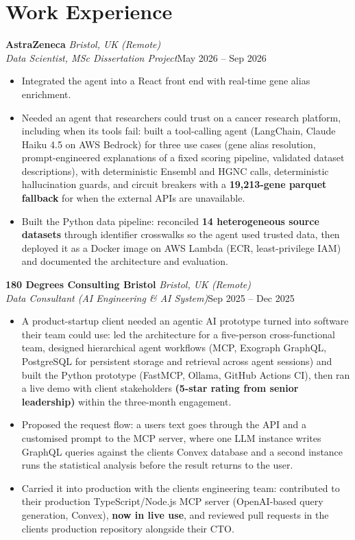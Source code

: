 \documentclass[a4paper,11pt]{article}
\newcommand{\role}[4]{%
  \textbf{#1}{\color{muted}\,\textperiodcentered\,\textit{#2}}\\
  \textit{#4}\hfill{\color{muted}#3}\par}
\newcommand{\gap}{\vspace{5pt}}
\newcommand{\num}[1]{\textbf{#1}}   %
\begin{document}
\section{Work Experience}
\role{AstraZeneca}{Bristol, UK (Remote)}{May 2026 – Sep 2026}{Data Scientist, MSc Dissertation Project}
\begin{itemize}
  \item Integrated the agent into a React front end with real-time gene alias enrichment.
  \item Needed an agent that researchers could trust on a cancer research platform, including when its tools fail: built a tool-calling agent (LangChain, Claude Haiku 4.5 on AWS Bedrock) for three use cases (gene alias resolution, prompt-engineered explanations of a fixed scoring pipeline, validated dataset descriptions), with deterministic Ensembl and HGNC calls, deterministic hallucination guards, and circuit breakers with a \num{19,213-gene parquet fallback} for when the external APIs are unavailable.
  \item Built the Python data pipeline: reconciled \num{14 heterogeneous source datasets} through identifier crosswalks so the agent used trusted data, then deployed it as a Docker image on AWS Lambda (ECR, least-privilege IAM) and documented the architecture and evaluation.
\end{itemize}
\gap
{}
\role{180 Degrees Consulting Bristol}{Bristol, UK (Remote)}{Sep 2025 – Dec 2025}{Data Consultant (AI Engineering \& AI System)}
\begin{itemize}
  \item A product-startup client needed an agentic AI prototype turned into software their team could use: led the architecture for a five-person cross-functional team, designed hierarchical agent workflows (MCP, Exograph GraphQL, PostgreSQL for persistent storage and retrieval across agent sessions) and built the Python prototype (FastMCP, Ollama, GitHub Actions CI), then ran a live demo with client stakeholders \num{(5-star rating from senior leadership)} within the three-month engagement.
  \item Proposed the request flow: a user\textquotesingle{}s text goes through the API and a customised prompt to the MCP server, where one LLM instance writes GraphQL queries against the client\textquotesingle{}s Convex database and a second instance runs the statistical analysis before the result returns to the user.
  \item Carried it into production with the client\textquotesingle{}s engineering team: contributed to their production TypeScript/Node.js MCP server (OpenAI-based query generation, Convex), \num{now in live use}, and reviewed pull requests in the client\textquotesingle{}s production repository alongside their CTO.
\end{itemize}
\end{document}
